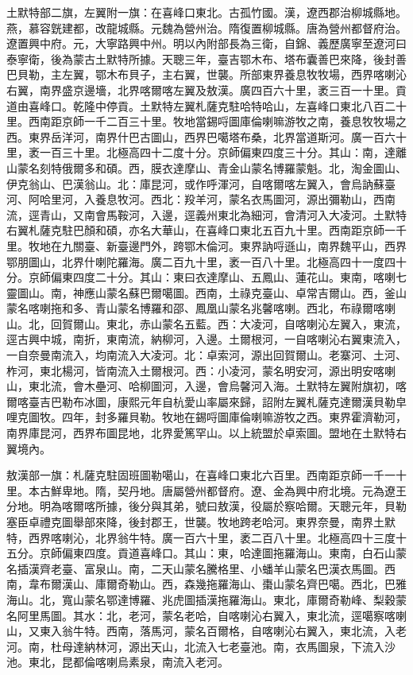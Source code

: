 \begin{pinyinscope}
土默特部二旗，左翼附一旗：在喜峰口東北。古孤竹國。漢，遼西郡治柳城縣地。燕，慕容皝建都，改龍城縣。元魏為營州治。隋復置柳城縣。唐為營州都督府治。遼置興中府。元，大寧路興中州。明以內附部長為三衛，自錦、義歷廣寧至遼河曰泰寧衛，後為蒙古土默特所據。天聰三年，臺吉鄂木布、塔布囊善巴來降，後封善巴貝勒，主左翼，鄂木布貝子，主右翼，世襲。所部東界養息牧牧場，西界喀喇沁右翼，南界盛京邊墻，北界喀爾喀左翼及敖漢。廣四百六十里，袤三百一十里。貢道由喜峰口。乾隆中停貢。土默特左翼札薩克駐哈特哈山，左喜峰口東北八百二十里。西南距京師一千二百三十里。牧地當錫哷圖庫倫喇嘛游牧之南，養息牧牧場之西。東界岳洋河，南界什巴古圖山，西界巴噶塔布桑，北界當道斯河。廣一百六十里，袤一百三十里。北極高四十二度十分。京師偏東四度三十分。其山：南，達離山蒙名刻特俄爾多和碩。西，膜衣達摩山、青金山蒙名博羅蒙魁。北，淘金圖山、伊克翁山、巴漢翁山。北：庫昆河，或作呼渾河，自喀爾喀左翼入，會烏訥蘇臺河、阿哈里河，入養息牧河。西北：羖羊河，蒙名衣馬圖河，源出彌勒山，西南流，逕青山，又南會馬鞍河，入邊，逕義州東北為細河，會清河入大凌河。土默特右翼札薩克駐巴顏和碩，亦名大華山，在喜峰口東北五百九十里。西南距京師一千里。牧地在九關臺、新臺邊門外，跨鄂木倫河。東界訥哷遜山，南界魏平山，西界鄂朋圖山，北界什喇陀羅海。廣二百九十里，袤一百八十里。北極高四十一度四十分。京師偏東四度二十分。其山：東曰衣達摩山、五鳳山、蓮花山。東南，喀喇七靈圖山。南，神應山蒙名蘇巴爾噶圖。西南，土祿克臺山、卓常吉爾山。西，釜山蒙名喀喇拖和多、青山蒙名博羅和邵、鳳凰山蒙名兆馨喀喇。西北，布祿爾喀喇山。北，回賀爾山。東北，赤山蒙名五藍。西：大凌河，自喀喇沁左翼入，東流，逕古興中城，南折，東南流，納柳河，入邊。土爾根河，一自喀喇沁右翼東流入，一自奈曼南流入，均南流入大凌河。北：卓索河，源出回賀爾山。老寨河、土河、柞河，東北楊河，皆南流入土爾根河。西：小凌河，蒙名明安河，源出明安喀喇山，東北流，會木壘河、哈柳圖河，入邊，會烏馨河入海。土默特左翼附旗初，喀爾喀臺吉巴勒布冰圖，康熙元年自杭愛山率屬來歸，詔附左翼札薩克達爾漢貝勒皁哩克圖牧。四年，封多羅貝勒。牧地在錫哷圖庫倫喇嘛游牧之西。東界霍濟勒河，南界庫昆河，西界布圖昆地，北界愛篤罕山。以上統盟於卓索圖。盟地在土默特右翼境內。

敖漢部一旗：札薩克駐固班圖勒噶山，在喜峰口東北六百里。西南距京師一千一十里。本古鮮卑地。隋，契丹地。唐屬營州都督府。遼、金為興中府北境。元為遼王分地。明為喀爾喀所據，後分與其弟，號曰敖漢，役屬於察哈爾。天聰元年，貝勒塞臣卓禮克圖舉部來降，後封郡王，世襲。牧地跨老哈河。東界奈曼，南界土默特，西界喀喇沁，北界翁牛特。廣一百六十里，袤二百八十里。北極高四十三度十五分。京師偏東四度。貢道喜峰口。其山：東，哈達圖拖羅海山。東南，白石山蒙名插漢齊老臺、富泉山。南，二天山蒙名騰格里、小蟠羊山蒙名巴漢衣馬圖。西南，韋布爾漢山、庫爾奇勒山。西，森幾拖羅海山、棗山蒙名齊巴噶。西北，巴雅海山。北，寬山蒙名鄂達博羅、兆虎圖插漢拖羅海山。東北，庫爾奇勒峰、梨穀蒙名阿里馬圖。其水：北，老河，蒙名老哈，自喀喇沁右翼入，東北流，逕噶察喀喇山，又東入翁牛特。西南，落馬河，蒙名百爾格，自喀喇沁右翼入，東北流，入老河。南，杜母達納林河，源出天山，北流入七老臺池。南，衣馬圖泉，下流入沙池。東北，昆都倫喀喇烏素泉，南流入老河。


\end{pinyinscope}
